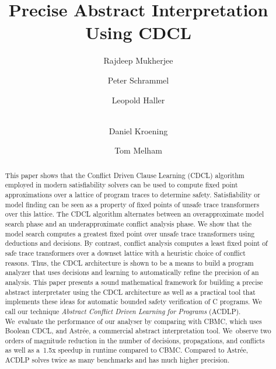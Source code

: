 \documentclass[smallcondensed]{svjour3}
\begin{document}
\title{Precise Abstract Interpretation Using CDCL}

\author{Rajdeep Mukherjee \and Peter Schrammel \and 
Leopold Haller \and \\ 
Daniel Kroening \and Tom Melham}




\maketitle

\begin{abstract}
%
This paper shows that the Conflict Driven Clause Learning (CDCL) algorithm
employed in modern satisfiability solvers can be used to compute fixed point
approximations over a lattice of program traces to determine safety. 
Satisfiability or model finding can be seen as a property of fixed points of
unsafe trace transformers over this lattice.  The CDCL algorithm alternates
between an overapproximate model search phase and an underapproximate
conflict analysis phase.  We show that the model search computes a greatest
fixed point over unsafe trace transformers using deductions and decisions. 
By contrast, conflict analysis computes a least fixed point of safe trace
transformers over a downset lattice with a heuristic choice of conflict
reasons.  Thus, the CDCL architecture is shown to be a means to build a
program analyzer that uses decisions and learning to automatically refine
the precision of an analysis.  This paper presents a sound mathematical
framework for building a precise abstract interpretater using the CDCL
architecture as well as a practical tool that implements these ideas for
automatic bounded safety verification of C programs.  We call our technique
\emph{Abstract Conflict Driven Learning for Programs} (ACDLP).  We~evaluate
the performance of our analyser by comparing with CBMC, which uses Boolean
CDCL, and Astr{\'e}e, a commercial abstract interpretation tool.  We~observe
two orders of magnitude reduction in the number of decisions, propagations,
and conflicts as well as a~1.5x speedup in runtime compared to CBMC. 
Compared to Astr{\'e}e, ACDLP solves twice as many benchmarks and has much
higher precision.
%
\end{abstract}
\end{document}
